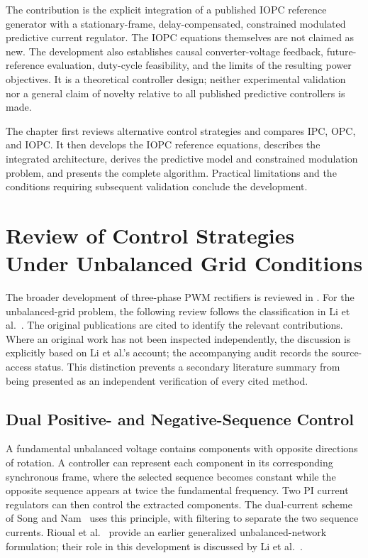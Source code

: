 The contribution is the explicit integration of a published IOPC reference generator with a stationary-frame, delay-compensated, constrained modulated predictive current regulator. The IOPC equations themselves are not claimed as new. The development also establishes causal converter-voltage feedback, future-reference evaluation, duty-cycle feasibility, and the limits of the resulting power objectives. It is a theoretical controller design; neither experimental validation nor a general claim of novelty relative to all published predictive controllers is made.

The chapter first reviews alternative control strategies and compares IPC, OPC, and IOPC. It then develops the IOPC reference equations, describes the integrated architecture, derives the predictive model and constrained modulation problem, and presents the complete algorithm. Practical limitations and the conditions requiring subsequent validation conclude the development.

\section{Review of Control Strategies Under Unbalanced Grid Conditions}
\label{sec:ch5-review}
The broader development of three-phase PWM rectifiers is reviewed in \cite{ch5-singh2004,ch5-rodriguez2005}. For the unbalanced-grid problem, the following review follows the classification in Li et al.~\cite{li2010journal}. The original publications are cited to identify the relevant contributions. Where an original work has not been inspected independently, the discussion is explicitly based on Li et al.'s account; the accompanying audit records the source-access status. This distinction prevents a secondary literature summary from being presented as an independent verification of every cited method.

\subsection{Dual Positive- and Negative-Sequence Control}
A fundamental unbalanced voltage contains components with opposite directions of rotation. A controller can represent each component in its corresponding synchronous frame, where the selected sequence becomes constant while the opposite sequence appears at twice the fundamental frequency. Two PI current regulators can then control the extracted components. The dual-current scheme of Song and Nam~\cite{song1999} uses this principle, with filtering to separate the two sequence currents. Rioual et al.~\cite{ch5-rioual1996} provide an earlier generalized unbalanced-network formulation; their role in this development is discussed by Li et al.~\cite{li2010journal}.

